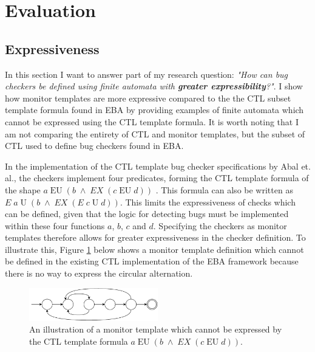 \section{Evaluation}

\subsection{Expressiveness}

In this section I want to answer part of my research question: \textit{"How can bug checkers be defined using finite automata with \textbf{greater expressibility}?"}. I show how monitor templates are more expressive compared to the the CTL subset template formula found in EBA by providing examples of finite automata which cannot be expressed using the CTL template formula. It is worth noting that I am not comparing the entirety of CTL and monitor templates, but the subset of CTL used to define bug checkers found in EBA. 

\newpar In the implementation of the CTL template bug checker specifications by Abal et. al., the checkers implement four predicates, forming the CTL template formula of the shape $a\;\text{EU}\;(b\;\land\;EX\;(c\;\text{EU}\;d))$ \cite{Abal2017EffectiveBF}\cite{research-project}. This formula can also be written as $E\;a\;\text{U}\;(b\;\land\;EX\;(E\;c\;\text{U}\;d))$. This limits the expressiveness of checks which can be defined, given that the logic for detecting bugs must be implemented within these four functions $a$, $b$, $c$ and $d$. Specifying the checkers as monitor templates therefore allows for greater expressiveness in the checker definition. To illustrate this, Figure \ref{expressive-monitor} below shows a monitor template definition which cannot be defined in the existing CTL implementation of the EBA framework because there is no way to express the circular alternation.

\begin{figure}[H]
    \centering
    \includegraphics[width=0.5\textwidth]{evaluation/figures/monitor}
    \caption{An illustration of a monitor template which cannot be expressed by the CTL template formula $a\;\text{EU}\;(b\;\land\;EX\;(c\;\text{EU}\;d))$.}
    \label{expressive-monitor}
\end{figure}

